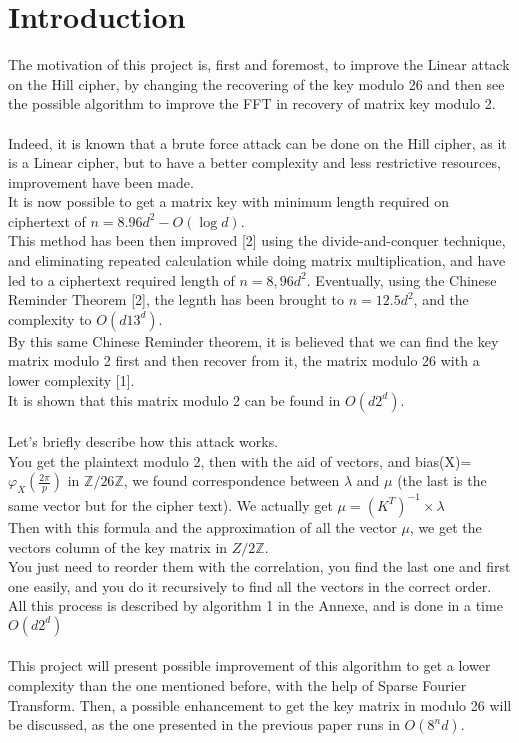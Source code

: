 \documentclass{article}
\begin{document}


\section{Introduction}
The motivation of this project is, first and foremost, to improve the Linear attack on the Hill cipher, by changing the recovering of the key modulo 26 and then see the possible algorithm to improve the FFT in recovery of matrix key modulo 2.\\
\\
Indeed, it is known that a brute force attack can be done on the Hill cipher, as it is a Linear cipher, but to have a better complexity and less restrictive resources, improvement have been made.\\
It is now possible to get a matrix key with minimum length required on ciphertext of $n =8.96d^2 -O(\log d)$.\\
This method has been then improved [2] using the divide-and-conquer technique, and eliminating repeated calculation while doing matrix multiplication, and have led to a ciphertext required length of $n=8,96d^2$. Eventually, using the Chinese Reminder Theorem [2], the legnth has been brought to $n=12.5d^2$, and the complexity to $O(d13^d)$.\\
By this same Chinese Reminder theorem, it is believed that we can find the key matrix modulo 2 first and then recover from it, the matrix modulo 26 with a lower complexity [1].\\
It is shown that this matrix modulo 2 can be found in $O(d2^d)$.\\
\\
Let's briefly describe how this attack works.\\
You get the plaintext modulo 2, then with the aid of vectors, and bias(X)= $\varphi_{X}(\frac{2\pi}{p})$ in $\mathbb{Z}/26\mathbb{Z}$, we found correspondence between $\lambda$ and $\mu$ (the last is the same vector but for the cipher text). We actually get $ \mu = (K^T)^{-1} \times\lambda $\\
Then with this formula and the approximation of all the vector $\mu$, we get the vectors column of the key matrix in ${Z}/2\mathbb{Z}$.\\
You just need to reorder them with the correlation, you find the last one and first one easily, and you do it recursively to find all the vectors in the correct order.\\
All this process is described by algorithm 1 in the Annexe, and is done in a time $O(d 2^d)$\\
\\
This project will present possible improvement of this algorithm to get a lower complexity than the one mentioned before, with the help of Sparse Fourier Transform. Then, a possible enhancement to get the key matrix in modulo 26 will be discussed, as the one presented in the previous paper runs in $O(8^nd)$.\\
\end{document}
